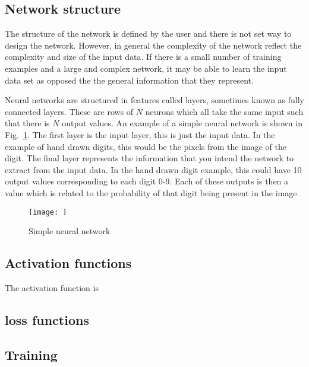 \subsection{\label{machine:nn:structure}Network structure}

The structure of the network is defined by the user and there is not set way to design the network.
However, in general the complexity of the network reflect the complexity and size of the input data.
If there is a small number of training examples and a large and complex network, it may be able to learn the input data set as opposed the the general information that they represent.

Neural networks are structured in features called layers, sometimes known as fully connected layers. 
These are rows of $N$ neurons which all take the same input such that there is $N$ output values.
An example of a simple neural network is shown in Fig.~\ref{machine:nn:structure:plot}.
The first layer is the input layer, this is just the input data.
In the example of hand drawn digits, this would be the pixels from the image of the digit.
The final layer represents the information that you intend the network to extract from the input data. 
In the hand drawn digit example, this could have 10 output values corresponding to each digit 0-9. 
Each of these outputs is then a value which is related to the probability of that digit being present in the image.  

\begin{figure}[h]
    \centering
    \texttt{[image: ]}
    \caption{Simple neural network}
    \label{machine:nn:structure:plot}
\end{figure}


\subsection{\label{machine:nn:activation}Activation functions}

The activation function is


\subsection{\label{machine:nn:loss}loss functions}


\subsection{\label{machine:nn:training}Training}

